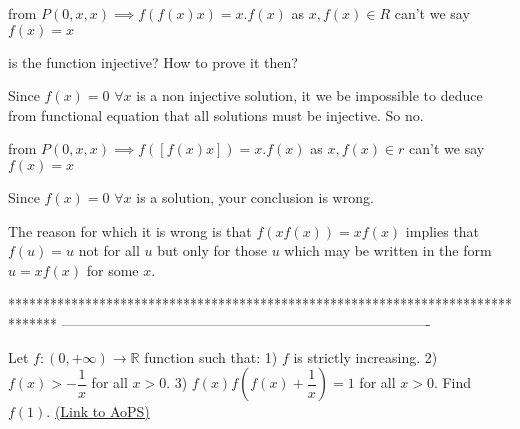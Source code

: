 \begin{solution}
	from $P(0,x,x)\implies f(f(x)x)=x.f(x)$
as $x,f(x)\in R$
can't we say $f(x)=x$
\end{solution}



\begin{solution}
	\begin{tcolorbox}is the function injective?
How to prove it then?\end{tcolorbox}
Since $f(x)=0$ $\forall x$ is a non injective solution, it we be impossible to deduce from functional equation that all solutions must be injective.
So no.

\begin{tcolorbox}from $P(0,x,x)\implies f([f(x)x])=x.f(x)$
as $x,f(x)\in r$
can't we say $f(x)=x$\end{tcolorbox}

Since $f(x)=0$ $\forall x$ is a solution, your conclusion is wrong.

The reason for which it is wrong is that $f(xf(x))=xf(x)$ implies that $f(u)=u$ not for all $u$ but only for those $u$ which may be written in the form $u=xf(x)$ for some $x$.
\end{solution}
*******************************************************************************
-------------------------------------------------------------------------------

\begin{problem}
	Let $f:(0,+\infty)\rightarrow\mathbb{R}$ function such that:
1) $f$ is strictly increasing.
2) $f(x)>-\dfrac{1}{x}$ for all $x>0$.
3) $f(x)f(f(x)+\dfrac{1}{x})=1$ for all $x>0$.
Find $f(1)$.
	\flushright \href{https://artofproblemsolving.com/community/c6h571356}{(Link to AoPS)}
\end{problem}



